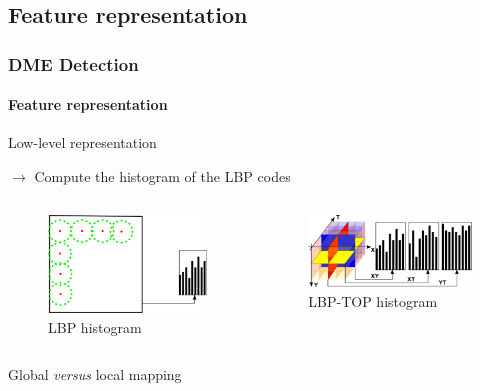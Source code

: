 \documentclass{beamer}
\begin{document}
\subsection{Feature representation}

\begin{frame}
  \frametitle{DME Detection}
  \framesubtitle{Feature representation}
  \begin{block}{Low-level representation}\footnotesize
    \begin{center}
      $\rightarrow$ Compute the histogram of the LBP codes
    \end{center}
    \vspace{-.6cm}
    \begin{columns}
      \begin{column}{.5\linewidth}
        \begin{figure}
          \centering
          \includegraphics[width=.4\textwidth]{./images/lbp-hist.png}
          \caption{LBP histogram}
        \end{figure}
       \end{column}
      \begin{column}{.5\linewidth}
        \begin{figure}
          \centering
          \includegraphics[width=.5\textwidth]{./images/LBPTOP_fig.png}
          \caption{LBP-TOP histogram}
        \end{figure}
      \end{column}
    \end{columns}
  \end{block}
  \begin{block}{Global \textit{versus} local mapping}
    \begin{columns}
      \begin{column}{.5\linewidth}
        \begin{itemize}\footnotesize

\end{itemize}
\end{column}
\end{columns}
\end{block}
\end{frame}
\end{document}
